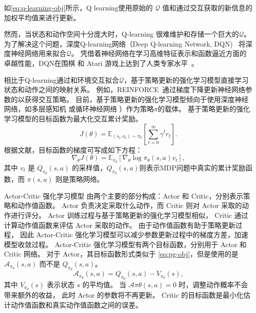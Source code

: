 如\autoref{eq:q-learning-obj}所示，Q learning使用原始的 $\mathcal{Q}$ 值和通过交互获取的新信息的加权平均值来进行更新。

然而，当状态和动作空间十分庞大时，Q-learning 很难维护和存储一个巨大的$\mathcal{Q}$。
为了解决这个问题，深度Q-learning网络（Deep Q-learning Network, DQN)~\cite{MKSGAWR13} 将深度神经网络用来拟合$\mathcal{Q}$。
凭借着神经网络在学习高维特征表示和函数逼近方面的卓越性能，DQN在围棋 \cite{SSSAHGHBLB17} 和 Atari 游戏上达到了人类专家水平~\cite{MKSGAWR13}。

相比于Q-learning通过和环境交互拟合$\mathcal{Q}$，基于策略更新的强化学习模型直接学习状态和动作之间的映射关系。
例如，REINFORCE~\cite{W92}通过梯度下降更新神经网络参数的以获得交互策略。
目前，基于策略更新的强化学习模型倾向于使用深度神经网络，如多层感知机 \cite{XLZP18} 或循环神经网络 \cite{ZMFLA16}）作为策略$\pi$的载体。
基于策略更新的强化学习模型的目标函数为最大化交互累计奖励。
\begin{equation}
    \label{eq:pg-obj}
    J(\theta)=\mathbb{E}_{\left(s_{t}, a_{t}\right) \sim \pi_{\theta}}\left[\sum_{t=0}^{\infty} \gamma^{t} r_{t}\right]. 
\end{equation}
根据文献{\rm\parencite{KT99}}，目标函数的梯度可写成如下方程：
\begin{equation}
    \nabla_{\theta} J(\theta)=\mathbb{E}_{\pi_{\theta}}\left[\nabla_{\theta} \log \pi_{\theta}(s, a) v_t\right], 
\end{equation}
其中 $v_t$ 是 $Q_{\pi_{\theta}}(s,a)$ 的采样值，$Q_{\pi_{\theta}}(s,a)$则表示MDP问题中真实的累计奖励函数，而 $\pi\left(s, a\right)$ 则是策略网络。

Actor-Critic 强化学习模型 \cite{MBMGLHSK16} 由两个主要的部分构成：Actor 和 Critic，分别表示策略和动作值函数。
Actor 负责决定采取什么动作，而 Critic 则对 Actor 采取的动作进行评分。
Actor 训练过程与基于策略更新的强化学习模型相似，
Critic 通过计算动作值函数来评估 Actor 采取的动作。
由于动作值函数有助于策略更新过程，
因此 Actor-Critic 强化学习模型可以减少参数更新过程中的梯度方差，加速模型收敛过程。
Actor-Critic 强化学习模型有两个目标函数，分别用于 Actor 和 Critic 网络。
对于 Actor，其目标函数形式类似于 \autoref{eq:pg-obj}，但是使用的是 $\mathcal{A}_{\pi_{\theta}}(s, a)$ 而不是 $Q_{\pi_{\theta}}(s, a)$。
\begin{equation}
    \mathcal{A}_{\pi_{\theta}}(s, a)=Q_{\pi_{\theta}}(s, a)-V_{\pi_{\theta}}(s), 
\end{equation}
其中 $V_{\pi_{\theta}}(s)$ 表示状态 $s$ 的平均值。
当 $\mathcal{A}{\pi{\theta}}(s, a) = 0$ 时，调整动作概率不会带来额外的收益，
此时 Actor 的参数将不再更新。
Critic 的目标函数是最小化估计动作值函数和真实动作值函数之间的误差。

